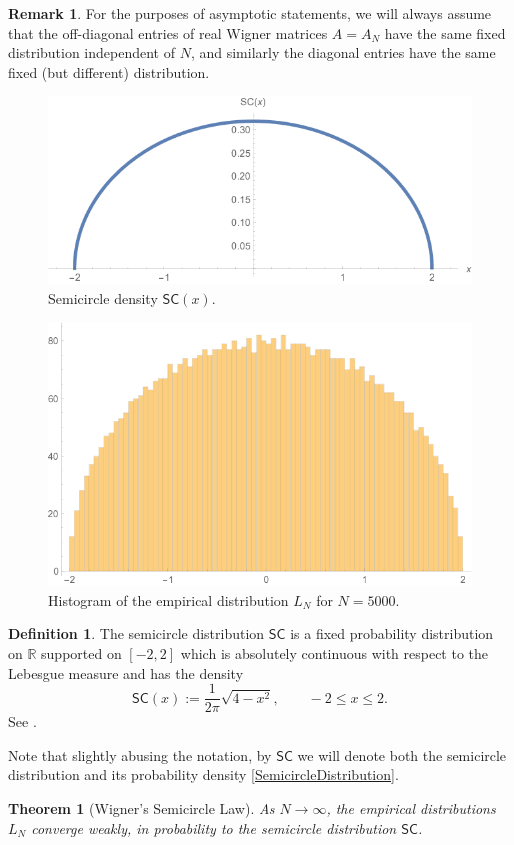 \documentclass[letterpaper,11pt,oneside,reqno]{amsart}
\numberwithin{equation}{section}
\newcommand{\SC}{\mathsf{SC}}
\newtheorem{theorem}[proposition]{Theorem}
\theoremstyle{definition}
\newtheorem{definition}[proposition]{Definition}
\newtheorem{remark}[proposition]{Remark}
\begin{document}
\begin{remark}
	For the purposes of asymptotic statements, we will always assume that the 
	off-diagonal entries of real Wigner matrices 
	$A=A_N$ have the same fixed distribution independent of $N$,
	and similarly the diagonal entries 
	have the same fixed (but different) distribution.
\end{remark}

\begin{figure}[htbp]
	\includegraphics[width=.5\textwidth]{img/SC.png}
	\caption{Semicircle density $\SC(x)$.}
	\label{fig:semicircle}
\end{figure}

\begin{figure}[htbp]
	\includegraphics[width=.5\textwidth]{img/Wigner1.png}
	\caption{Histogram of the empirical distribution 
	$L_N$ for $N=5000$.}
	\label{fig:Wigner}
\end{figure}

\begin{definition}
	The semicircle distribution $\SC$ is 
	a fixed probability distribution on $\mathbb{R}$
	supported on $[-2,2]$
	which is absolutely continuous with respect to the
	Lebesgue measure and has the density
	\begin{equation}\label{SemicircleDistribution}
		\SC(x):=\frac{1}{2\pi}\sqrt{4-x^2}, \qquad -2\leq x\leq 2.
	\end{equation}
	See .

	Note that slightly abusing the notation, by $\SC$ we will denote both the
	semicircle distribution and its probability density \eqref{SemicircleDistribution}.
\end{definition}

\begin{theorem}[Wigner's Semicircle Law]\label{thm:SemicircleLaw}
	As $N\to\infty$,
	the empirical distributions 
	$L_N$ converge weakly, in probability to the 
	semicircle distribution $\SC$.
\end{theorem}
\end{document}
